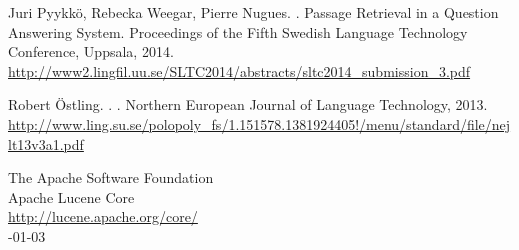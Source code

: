 \documentclass[11pt,letterpaper]{article}
\begin{document}
\begin{thebibliography}{}

\iffalse
\bibitem[\protect\citename{Aho and Ullman}1972]{Aho:72}
Alfred~V. Aho and Jeffrey~D. Ullman.
\newblock 1972.
\newblock {\em The Theory of Parsing, Translation and Compiling}, volume~1.
\newblock Prentice-{Hall}, Englewood Cliffs, NJ.

\bibitem[\protect\citename{{American Psychological Association}}1983]{APA:83}
{American Psychological Association}.
\newblock 1983.
\newblock {\em Publications Manual}.
\newblock American Psychological Association, Washington, DC.

\bibitem[\protect\citename{{Association for Computing Machinery}}1983]{ACM:83}
{Association for Computing Machinery}.
\newblock 1983.
\newblock {\em Computing Reviews}, 24(11):503--512.

\bibitem[\protect\citename{Chandra \bgroup et al.\egroup }1981]{Chandra:81}
Ashok~K. Chandra, Dexter~C. Kozen, and Larry~J. Stockmeyer.
\newblock 1981.
\newblock Alternation.
\newblock {\em Journal of the Association for Computing Machinery},
  28(1):114--133.

\bibitem[\protect\citename{Gusfield}1997]{Gusfield:97}
Dan Gusfield.
\newblock 1997.
\newblock {\em Algorithms on Strings, Trees and Sequences}.
\newblock Cambridge University Press, Cambridge, UK.
\fi

Juri Pyykk\"o, Rebecka Weegar, Pierre Nugues.
.
\newblock Passage Retrieval in a Question Answering System. 
\newblock Proceedings of the Fifth Swedish Language Technology Conference, Uppsala, 2014.
\newblock \url{http://www2.lingfil.uu.se/SLTC2014/abstracts/sltc2014_submission_3.pdf}

Robert \"Ostling.
.
.
\newblock Northern European Journal of Language Technology, 2013.
\newblock \url{http://www.ling.su.se/polopoly_fs/1.151578.1381924405!/menu/standard/file/nejlt13v3a1.pdf}

The Apache Software Foundation \\
\newblock Apache Lucene Core \\
\newblock \url{http://lucene.apache.org/core/} \\
-01-03


\end{thebibliography}
\end{document}
